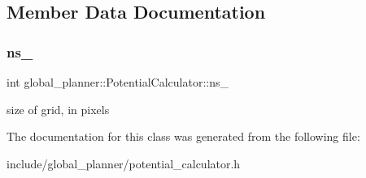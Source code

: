 \subsection{Member Data Documentation}
\mbox{\label{classglobal__planner_1_1_potential_calculator_a5c62eff3a3c95db6cd6dedcb9cfb3e2a}} 
\subsubsection{\texorpdfstring{ns\+\_\+}{ns\_}}
{\footnotesize\ttfamily int global\+\_\+planner\+::\+Potential\+Calculator\+::ns\+\_\+\hspace{0.3cm}{\ttfamily [protected]}}

size of grid, in pixels 

The documentation for this class was generated from the following file\+:\begin{DoxyCompactItemize}
\item 
include/global\+\_\+planner/potential\+\_\+calculator.\+h\end{DoxyCompactItemize}
